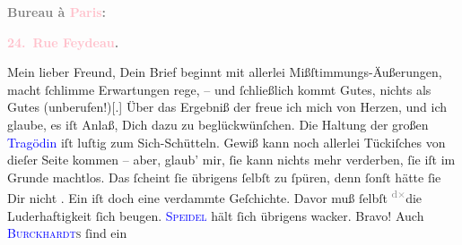            \pstart
           \begin{otherlanguage}{french}\textcolor{gray}{\textbf{\textbf{Bureau à \textcolor{pink}{Paris}{}\ledrightnote{\textcolor{pink}{Paris}}:}}}\end{otherlanguage}\pend
           \pstart
           \begin{otherlanguage}{french}\textcolor{gray}{\textbf{\textbf{\textcolor{pink}{24. Rue Feydeau}{}\ledrightnote{\textcolor{pink}{rue Feydeau}}.}}}\end{otherlanguage}\pend
           \pstart\center{}Mein lieber Freund,\pend\pstart
           Dein Brief beginnt mit allerlei Mißſtimmungs-Äußerungen, macht ſchlimme Erwartungen
               rege, – und ſchließlich kommt  Gutes, nichts als
               Gutes (unberufen!){[}.{]} Über das Ergebniß der \label{K_L02748-1v}\label{K_L02748-1h} freue ich mich von Herzen, und ich glaube, es iſt Anlaß, Dich dazu zu
               beglückwünſchen. Die Haltung der großen \textcolor{blue}{Tragödin}{} iſt luſtig zum Sich-Schütteln. Gewiß kann noch
               allerlei Tückiſches von dieſer Seite kommen – {\pb}aber,
               glaub’ mir, ſie kann nichts mehr verderben, ſie iſt im Grunde machtlos. Das ſcheint
               ſie übrigens ſelbſt zu ſpüren, denn ſonſt hätte ſie Dir nicht \label{K_L02748-2v}\label{K_L02748-2h}. Ein \label{K_L02748-3v}\label{K_L02748-3h} iſt doch eine verdammte Geſchichte. Davor muß ſelbſt \substVorne{}\textsuperscript{\textcolor{gray}{d}\textcolor{gray}{×}}\substDazwischen{}die\substHinten{} Luderhaftigkeit ſich beugen. \textsc{\textcolor{blue}{Speidel}{}\ledrightnote{\textcolor{blue}{Ludwig Speidel}}} hält ſich übrigens wacker. Bravo! Auch \textsc{\textcolor{blue}{Burckhardt}{}\ledrightnote{\textcolor{blue}{Max Eugen Burckhard}}s}{ }\label{K_L02748-4v}\label{K_L02748-4h} ſind ein
